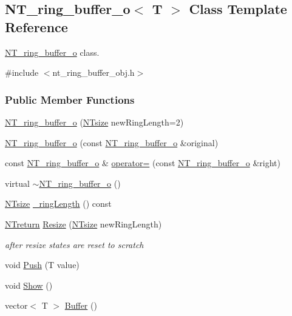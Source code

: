 \subsection{NT\_\-ring\_\-buffer\_\-o$<$ T $>$ Class Template Reference}
\label{class_n_t__ring__buffer__o}


\hyperlink{class_n_t__ring__buffer__o}{NT\_\-ring\_\-buffer\_\-o} class.  




{\ttfamily \#include $<$nt\_\-ring\_\-buffer\_\-obj.h$>$}

\subsubsection*{Public Member Functions}
\begin{DoxyCompactItemize}
\item 
\hyperlink{class_n_t__ring__buffer__o_a3264edac1b94525a4a5dcb182fd2aaff}{NT\_\-ring\_\-buffer\_\-o} (\hyperlink{nt__types_8h_a06c124f2e4469769b58230253ce0560b}{NTsize} newRingLength=2)
\item 
\hyperlink{class_n_t__ring__buffer__o_af56de04cda9e72a894ec74140f77fd0b}{NT\_\-ring\_\-buffer\_\-o} (const \hyperlink{class_n_t__ring__buffer__o}{NT\_\-ring\_\-buffer\_\-o} \&original)
\item 
const \hyperlink{class_n_t__ring__buffer__o}{NT\_\-ring\_\-buffer\_\-o} \& \hyperlink{class_n_t__ring__buffer__o_a4d8afaa170622da3c9607f137a956df4}{operator=} (const \hyperlink{class_n_t__ring__buffer__o}{NT\_\-ring\_\-buffer\_\-o} \&right)
\item 
virtual \hyperlink{class_n_t__ring__buffer__o_a17e53d888ed8cd7a33d94c29635ed530}{$\sim$NT\_\-ring\_\-buffer\_\-o} ()
\item 
\hyperlink{nt__types_8h_a06c124f2e4469769b58230253ce0560b}{NTsize} \hyperlink{class_n_t__ring__buffer__o_a8345e785c586da2bda9b4eed41f09dc8}{\_\-ringLength} () const 
\item 
\hyperlink{nt__types_8h_ab9564ee8f091e809d21b8451c6683c53}{NTreturn} \hyperlink{class_n_t__ring__buffer__o_ad29dd730de47d919552f79be26286660}{Resize} (\hyperlink{nt__types_8h_a06c124f2e4469769b58230253ce0560b}{NTsize} newRingLength)
\begin{DoxyCompactList}\small\item\em after resize states are reset to scratch \item\end{DoxyCompactList}\item 
void \hyperlink{class_n_t__ring__buffer__o_afa58fcaa8cf00b048aac4747e9862af3}{Push} (T value)
\item 
void \hyperlink{class_n_t__ring__buffer__o_a954b6f964f1ca530bb0575472c96c7f2}{Show} ()
\item 
vector$<$ T $>$ \hyperlink{class_n_t__ring__buffer__o_ad7037e3c1b552d97d1b4cd209b9408b0}{Buffer} ()
\end{DoxyCompactItemize}
